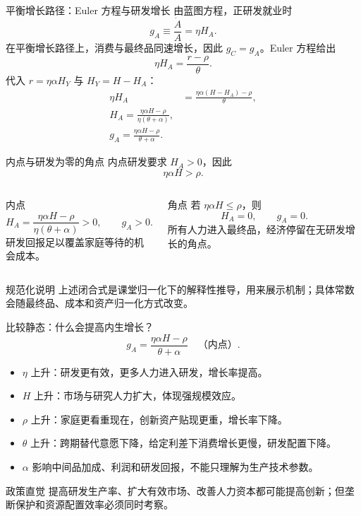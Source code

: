 \documentclass[aspectratio=32]{beamer}
\begin{document}
\begin{frame}{平衡增长路径：Euler 方程与研发增长}
\small
由蓝图方程，正研发就业时
\[
  g_A\equiv\frac{\dot A}{A}=\eta H_A.
\]
在平衡增长路径上，消费与最终品同速增长，因此 $g_C=g_A$。Euler 方程给出
\[
  \eta H_A=\frac{r-\rho}{\theta}.
\]
代入 $r=\eta\alpha H_Y$ 与 $H_Y=H-H_A$：
\begin{align*}
  \eta H_A&=\frac{\eta\alpha(H-H_A)-\rho}{\theta},\\
  \boxed{H_A=\frac{\eta\alpha H-\rho}{\eta(\theta+\alpha)}},\\
  \boxed{g_A=\frac{\eta\alpha H-\rho}{\theta+\alpha}}.
\end{align*}
\end{frame}

\begin{frame}{内点与研发为零的角点}
\small
内点研发要求 $H_A>0$，因此
\[
  \eta\alpha H>\rho.
\]
\begin{columns}[T]
\begin{block}{内点}
\[
  H_A=\frac{\eta\alpha H-\rho}{\eta(\theta+\alpha)}>0,
  \qquad g_A>0.
\]
研发回报足以覆盖家庭等待的机会成本。
\end{block}
\begin{block}{角点}
若 $\eta\alpha H\leq\rho$，则
\[
  H_A=0,\qquad g_A=0.
\]
所有人力进入最终品，经济停留在无研发增长的角点。
\end{block}
\end{columns}
\vspace{0.18cm}
\begin{alertblock}{规范化说明}
上述闭合式是课堂归一化下的解释性推导，用来展示机制；具体常数会随最终品、成本和资产归一化方式改变。
\end{alertblock}
\end{frame}

\begin{frame}{比较静态：什么会提高内生增长？}
\small
\[
  g_A=\frac{\eta\alpha H-\rho}{\theta+\alpha}
  \quad\text{（内点）}.
\]
\begin{itemize}
  \item $\eta$ 上升：研发更有效，更多人力进入研发，增长率提高。
  \item $H$ 上升：市场与研究人力扩大，体现\alert{强规模效应}。
  \item $\rho$ 上升：家庭更看重现在，创新资产贴现更重，增长率下降。
  \item $\theta$ 上升：跨期替代意愿下降，给定利差下消费增长更慢，研发配置下降。
  \item $\alpha$ 影响中间品加成、利润和研发回报，不能只理解为生产技术参数。
\end{itemize}
\begin{block}{政策直觉}
提高研发生产率、扩大有效市场、改善人力资本都可能提高创新；但垄断保护和资源配置效率必须同时考察。
\end{block}
\end{frame}
\end{document}
